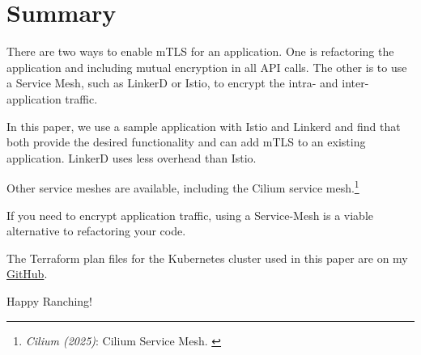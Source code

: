 %
%

\pagebreak
\section{Summary}

\onehalfspacing

There are two ways to enable mTLS for an application. One is refactoring the application and including mutual encryption in all API calls. The other is to use a Service Mesh, such as LinkerD or Istio, to encrypt the intra- and inter-application traffic.

In this paper, we use a sample application with Istio and Linkerd and find that both provide the desired functionality and can add mTLS to an existing application. LinkerD uses less overhead than Istio.

Other service meshes are available, including the Cilium service mesh.\footnote{\textit{Cilium (2025)}: Cilium Service Mesh. \cite{ciliumMesh}}

If you need to encrypt application traffic, using a Service-Mesh is a viable alternative to refactoring your code.

The Terraform plan files for the Kubernetes cluster used in this paper are on my \href{https://github.com/chfrank-cgn/Rancher/tree/master/aks-cluster}{GitHub}.

Happy Ranching!
